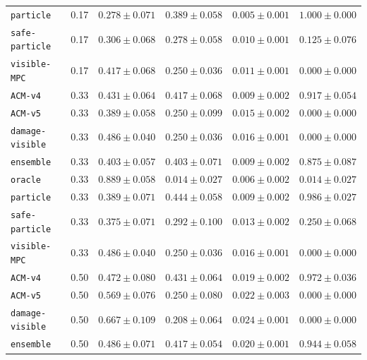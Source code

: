 \documentclass{article}
\begin{document}
\begin{center}
\begin{tabular}{lccccc}
\texttt{particle} & 0.17 & $0.278 \pm 0.071$ & $0.389 \pm 0.058$ & $0.005 \pm 0.001$ & $1.000 \pm 0.000$ \\
\texttt{safe-particle} & 0.17 & $0.306 \pm 0.068$ & $0.278 \pm 0.058$ & $0.010 \pm 0.001$ & $0.125 \pm 0.076$ \\
\texttt{visible-MPC} & 0.17 & $0.417 \pm 0.068$ & $0.250 \pm 0.036$ & $0.011 \pm 0.001$ & $0.000 \pm 0.000$ \\
\texttt{ACM-v4} & 0.33 & $0.431 \pm 0.064$ & $0.417 \pm 0.068$ & $0.009 \pm 0.002$ & $0.917 \pm 0.054$ \\
\texttt{ACM-v5} & 0.33 & $0.389 \pm 0.058$ & $0.250 \pm 0.099$ & $0.015 \pm 0.002$ & $0.000 \pm 0.000$ \\
\texttt{damage-visible} & 0.33 & $0.486 \pm 0.040$ & $0.250 \pm 0.036$ & $0.016 \pm 0.001$ & $0.000 \pm 0.000$ \\
\texttt{ensemble} & 0.33 & $0.403 \pm 0.057$ & $0.403 \pm 0.071$ & $0.009 \pm 0.002$ & $0.875 \pm 0.087$ \\
\texttt{oracle} & 0.33 & $0.889 \pm 0.058$ & $0.014 \pm 0.027$ & $0.006 \pm 0.002$ & $0.014 \pm 0.027$ \\
\texttt{particle} & 0.33 & $0.389 \pm 0.071$ & $0.444 \pm 0.058$ & $0.009 \pm 0.002$ & $0.986 \pm 0.027$ \\
\texttt{safe-particle} & 0.33 & $0.375 \pm 0.071$ & $0.292 \pm 0.100$ & $0.013 \pm 0.002$ & $0.250 \pm 0.068$ \\
\texttt{visible-MPC} & 0.33 & $0.486 \pm 0.040$ & $0.250 \pm 0.036$ & $0.016 \pm 0.001$ & $0.000 \pm 0.000$ \\
\texttt{ACM-v4} & 0.50 & $0.472 \pm 0.080$ & $0.431 \pm 0.064$ & $0.019 \pm 0.002$ & $0.972 \pm 0.036$ \\
\texttt{ACM-v5} & 0.50 & $0.569 \pm 0.076$ & $0.250 \pm 0.080$ & $0.022 \pm 0.003$ & $0.000 \pm 0.000$ \\
\texttt{damage-visible} & 0.50 & $0.667 \pm 0.109$ & $0.208 \pm 0.064$ & $0.024 \pm 0.001$ & $0.000 \pm 0.000$ \\
\texttt{ensemble} & 0.50 & $0.486 \pm 0.071$ & $0.417 \pm 0.054$ & $0.020 \pm 0.001$ & $0.944 \pm 0.058$ \\
\bottomrule
\end{tabular}
\end{center}
\end{document}
